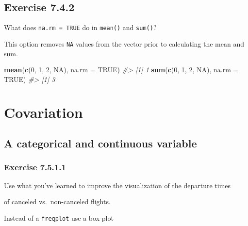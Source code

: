 \documentclass[]{book}
\newenvironment{Shaded}{\begin{snugshade}}{\end{snugshade}}
\newcommand{\CommentTok}[1]{\textcolor[rgb]{0.56,0.35,0.01}{\textit{#1}}}
\newcommand{\DataTypeTok}[1]{\textcolor[rgb]{0.13,0.29,0.53}{#1}}
\newcommand{\DecValTok}[1]{\textcolor[rgb]{0.00,0.00,0.81}{#1}}
\newcommand{\KeywordTok}[1]{\textcolor[rgb]{0.13,0.29,0.53}{\textbf{#1}}}
\newcommand{\NormalTok}[1]{#1}
\newcommand{\OtherTok}[1]{\textcolor[rgb]{0.56,0.35,0.01}{#1}}
\theoremstyle{plain}
\theoremstyle{remark}
\begin{document}
\hypertarget{exercise-7.4.2}{%
\subsection*{\texorpdfstring{Exercise
{7.4.2}}{Exercise 7.4.2}}\label{exercise-7.4.2}}

What does \texttt{na.rm\ =\ TRUE} do in \texttt{mean()} and
\texttt{sum()}?

This option removes \texttt{NA} values from the vector prior to
calculating the mean and sum.

\begin{Shaded}
\begin{Highlighting}[]
\KeywordTok{mean}\NormalTok{(}\KeywordTok{c}\NormalTok{(}\DecValTok{0}\NormalTok{, }\DecValTok{1}\NormalTok{, }\DecValTok{2}\NormalTok{, }\OtherTok{NA}\NormalTok{), }\DataTypeTok{na.rm =} \OtherTok{TRUE}\NormalTok{)}
\CommentTok{#> [1] 1}
\KeywordTok{sum}\NormalTok{(}\KeywordTok{c}\NormalTok{(}\DecValTok{0}\NormalTok{, }\DecValTok{1}\NormalTok{, }\DecValTok{2}\NormalTok{, }\OtherTok{NA}\NormalTok{), }\DataTypeTok{na.rm =} \OtherTok{TRUE}\NormalTok{)}
\CommentTok{#> [1] 3}
\end{Highlighting}
\end{Shaded}

\hypertarget{covariation}{%
\section{Covariation}\label{covariation}}

\hypertarget{a-categorical-and-continuous-variable}{%
\subsection{A categorical and continuous
variable}\label{a-categorical-and-continuous-variable}}

\hypertarget{exercise-7.5.1.1}{%
\subsubsection*{\texorpdfstring{Exercise
{7.5.1.1}}{Exercise 7.5.1.1}}\label{exercise-7.5.1.1}}

Use what you've learned to improve the visualization of the departure
times

of canceled vs.~non-canceled flights.

Instead of a \texttt{freqplot} use a box-plot
\end{document}
